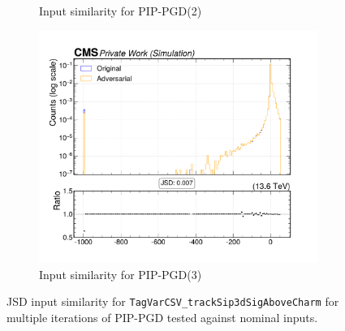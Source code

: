 \begin{figure}[htbp]
\begin{subfigure}[t]{0.32\textwidth}
    \caption*{Input similarity for PIP-PGD(2)}
  \end{subfigure}\hfill
  \begin{subfigure}[t]{0.32\textwidth}
    \includegraphics[width=\linewidth]{media/output/features/compare/combined_it_3/cmp_global_features_TagVarCSV_trackSip3dSigAboveCharm.pdf}
    \caption*{Input similarity for PIP-PGD(3)}
  \end{subfigure}

  \caption*{JSD input similarity for \texttt{TagVarCSV\_trackSip3dSigAboveCharm} for multiple iterations of PIP-PGD tested against nominal inputs.}
  \label{fig:combined_input_TagVarCSV_trackSip3dSigAboveCharm}
\end{figure}

